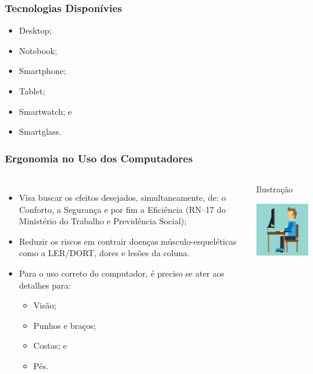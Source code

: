 \documentclass[aspectratio=169]{beamer} %
\begin{document}
\begin{frame}
	\frametitle{Tecnologias Disponívies}
	
	\begin{itemize}
		\item Desktop;
		\item Notebook;
		\item Smartphone;
		\item Tablet;
		\item Smartwatch; e
		\item Smartglass.
	\end{itemize}
\end{frame}

\begin{frame}
	\frametitle{Ergonomia no Uso dos Computadores}

\begin{columns}

	\begin{itemize}
		\item Visa buscar os efeitos desejados, simultaneamente, de: o Conforto, a Segurança e por fim a Eficiência (RN--17 do Ministério do Trabalho e Previdência Social);
		\item  Reduzir os riscos em contrair doenças músculo-esqueléticas como a LER/DORT, dores e lesões da coluna.
		\item Para o uso correto do computador, é preciso se ater aos detalhes para:
		\begin{itemize}
			\item Visão;
			\item Punhos e bra\c cos;
			\item Costas; e
			\item Pés.
		\end{itemize}
	\end{itemize}

	\begin{exampleblock}{Ilustra\c cão}
		\begin{center}
			\includegraphics[scale=0.4]{img/ergonomia}
		\end{center}			
	\end{exampleblock}

\end{columns}	
\end{frame}
\end{document}
